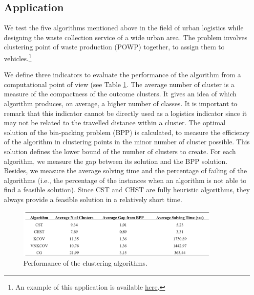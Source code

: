 \subsection{Application}
We test the five algorithms mentioned above in the field of urban logistics while designing the waste collection service of a wide urban area. The problem involves clustering point of waste production (POWP) together, to assign them to vehicles.\footnote{An example of this application is available \href{https://github.com/aletuf93/logproj/blob/master/examples/DIST_03\%20Route\%20topology\%20design.ipynb}{here}.} \par

We define three indicators to evaluate the performance of the algorithm from a computational point of view (see Table \ref{tab_ROMA_application}. The average number of cluster is a measure of the compactness of the outcome clusters. It gives an idea of which algorithm produces, on average, a higher number of classes. It is important to remark that this indicator cannot be directly used as a logistics indicator since it may not be related to the travelled distance within a cluster. The optimal solution of the bin-packing problem (BPP) is calculated, to measure the efficiency of the algorithm in clustering points in the minor number of cluster possible. This solution defines the lower bound of the number of clusters to create. For each algorithm, we measure the gap between its solution and the BPP solution. Besides, we measure the average solving time and the percentage of failing of the algorithms (i.e., the percentage of the instances when an algorithm is not able to find a feasible solution). Since CST and CHST are fully heuristic algorithms, they always provide a feasible solution in a relatively short time.

\begin{figure}[hbt!]
\centering
\includegraphics[width=0.9\textwidth]{SectionDistribution/design_figures/tab_ROMA_application.png}
\captionsetup{type=table}
\caption{Performance of the clustering algorithms.}
\label{tab_ROMA_application}
\end{figure}

